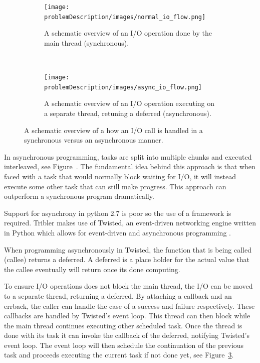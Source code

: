 \begin{figure}[t]
	\centering
	\begin{subfigure}[b]{\textwidth}
		\texttt{[image: problemDescription/images/normal\_io\_flow.png]}
		\caption{A schematic overview of an I/O operation done by the main thread (synchronous).}
		\label{fig:normal_io_flow}
	\end{subfigure}
	~ %
	\begin{subfigure}[b]{\textwidth}
		\texttt{[image: problemDescription/images/async\_io\_flow.png]}
		\caption{A schematic overview of an I/O operation executing on a separate thread, retuning a deferred (asynchronous).}
		\label{fig:async_io_flow}
	\end{subfigure}
	\caption{A schematic overview of a how an I/O call is handled in a synchronous versus an asynchronous manner.}
\end{figure}

In asynchronous programming, tasks are split into multiple chunks and executed interleaved, see Figure~.
The fundamental idea behind this approach is that when faced with a task that would normally block waiting for I/O, it will instead execute some other task that can still make progress.
This approach can outperform a synchronous program dramatically.

Support for asynchrony in python 2.7 is poor so the use of a framework is required.
Tribler makes use of Twisted, an event-driven networking engine written in Python which allows for event-driven and asynchronous programming \cite{kinder2005event}. 

When programming asynchronously in Twisted, the function that is being called (callee) returns a deferred.
A deferred is a place holder for the actual value that the callee eventually will return once its done computing.

To ensure I/O operations does not block the main thread, the I/O can be moved to a separate thread, returning a deferred.
By attaching a callback and an errback, the caller can handle the case of a success and failure respectively.
These callbacks are handled by Twisted's event loop.
This thread can then block while the main thread continues executing other scheduled task.
Once the thread is done with its task it can invoke the callback of the deferred, notifying Twisted's event loop.
The event loop will then schedule the continuation of the previous task and proceeds executing the current task if not done yet, see Figure~\ref{fig:async_io_flow}.

